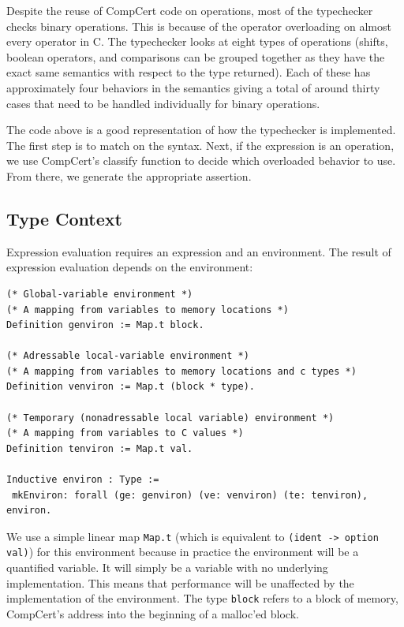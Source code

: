 \documentclass{puthesis}
\begin{document}
Despite the reuse of CompCert code on operations, most of the
typechecker checks binary operations. This is because of the operator
overloading on almost every operator in C. The typechecker looks at
eight types of operations (shifts, boolean operators, and comparisons
can be grouped together as they have the exact same semantics with
respect to the type returned). Each of these has approximately four
behaviors in the semantics giving a total of around thirty cases that
need to be handled individually for binary operations.
 
The code above is a good representation of how the typechecker is
implemented. The first step is to match on the syntax. Next, if the expression
is an operation, we use CompCert's classify function to decide which overloaded
behavior to use. From there, we generate the appropriate assertion. 

\subsection{Type Context}
\label{sec:context}

Expression evaluation requires an expression and an environment.  The
result of expression evaluation depends on the environment:

\begin{lstlisting}
(* Global-variable environment *)
(* A mapping from variables to memory locations *)
Definition genviron := Map.t block. 

(* Adressable local-variable environment *)
(* A mapping from variables to memory locations and c types *)
Definition venviron := Map.t (block * type).

(* Temporary (nonadressable local variable) environment *)
(* A mapping from variables to C values *)
Definition tenviron := Map.t val.

Inductive environ : Type :=
 mkEnviron: forall (ge: genviron) (ve: venviron) (te: tenviron), environ.
\end{lstlisting}

We use a simple linear map \lstinline|Map.t| (which is equivalent to
\lstinline|(ident -> option val)|) for this environment because in
practice the environment will be a quantified variable. It will simply
be a variable with no underlying implementation. This means that
performance will be unaffected by the implementation of the environment.
The type
\lstinline|block| refers to a block of memory, CompCert's address into the beginning of a
malloc'ed block.
\end{document}
